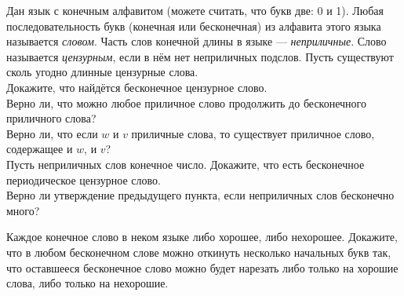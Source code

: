 \documentclass[a4paper,12pt]{article}
\begin{document}
Дан язык с конечным алфавитом (можете считать, что букв две: 0 и 1).
Любая последовательность букв (конечная или бесконечная) из алфавита этого языка называется {\em словом}.
Часть слов конечной длины в языке --- {\em неприличные}.
Слово называется {\em цензурным}, если в нём нет неприличных подслов.
Пусть существуют сколь угодно длин\-ные цензурные слова.\\
 Докажите, что найдётся бесконечное цензурное слово.\\
 Верно ли, что можно  любое приличное слово продолжить до бесконечного приличного слова? \\
  Верно ли, что если $w$ и $v$ приличные слова, то существует приличное слово, содержащее и $w$, и $v$?\\
 Пусть неприличных слов конечное число. Докажите, что есть бесконечное периодическое цензурное слово.\\
 Верно ли утверждение предыдущего пункта, если неприличных слов бесконечно много?


 Каждое конечное слово в неком языке либо
хорошее, либо нехорошее. Докажите, что в любом бесконечном слове
можно откинуть несколько начальных букв так, что оставшееся
бесконечное слово можно будет нарезать либо только на хорошие
слова, либо только на нехорошие.
















\end{document}
